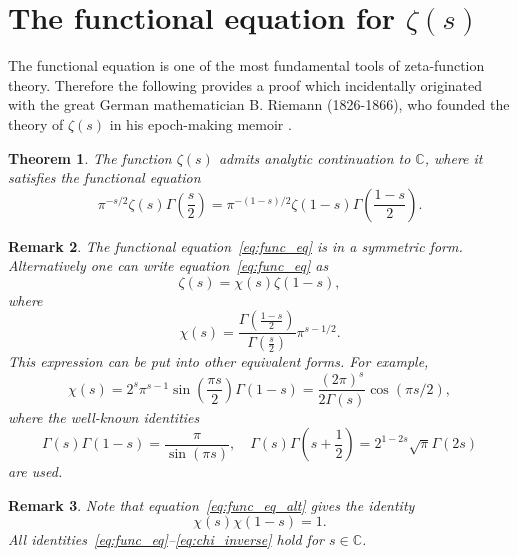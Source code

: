\documentclass[11pt]{article}
\newtheorem{theorem}{Theorem}[section]
\newtheorem{remark}[theorem]{Remark}
\begin{document}
\section{The functional equation for $\zeta(s)$}\label{sec:func_eq}

The functional equation is one of the most fundamental tools of zeta-function theory. Therefore the following provides a proof which incidentally originated with the great German mathematician B. Riemann (1826-1866), who founded the theory of $\zeta(s)$ in his epoch-making memoir \cite{Rie}.

\begin{theorem}\label{thm:func_eq}
The function $\zeta(s)$ admits analytic continuation to $\mathbb{C}$, where it satisfies the functional equation
\begin{equation}\label{eq:func_eq}
\pi^{-s/2} \zeta(s) \Gamma\left(\frac{s}{2}\right) = \pi^{-(1-s)/2} \zeta(1-s) \Gamma\left(\frac{1-s}{2}\right).
\end{equation}
\end{theorem}

\begin{remark}\label{rem:func_eq_alt}
The functional equation~\eqref{eq:func_eq} is in a symmetric form. Alternatively one can write equation~\eqref{eq:func_eq} as
\begin{equation}\label{eq:func_eq_alt}
\zeta(s) = \chi(s) \zeta(1-s),
\end{equation}
where
\begin{equation}\label{eq:chi_def}
\chi(s) = \frac{\Gamma\left(\frac{1-s}{2}\right)}{\Gamma\left(\frac{s}{2}\right)} \pi^{s-1/2}.
\end{equation}
This expression can be put into other equivalent forms. For example,
\begin{equation}\label{eq:chi_alt}
\chi(s) = 2^s \pi^{s-1} \sin\left(\frac{\pi s}{2}\right) \Gamma(1-s) = \frac{(2\pi)^s}{2\Gamma(s)} \cos(\pi s/2),
\end{equation}
where the well-known identities
\begin{equation}\label{eq:gamma_identities}
\Gamma(s)\Gamma(1-s) = \frac{\pi}{\sin(\pi s)}, \quad \Gamma(s)\Gamma\left(s + \frac{1}{2}\right) = 2^{1-2s}\sqrt{\pi}\Gamma(2s)
\end{equation}
are used.
\end{remark}

\begin{remark}\label{rem:chi_property}
Note that equation~\eqref{eq:func_eq_alt} gives the identity
\begin{equation}\label{eq:chi_inverse}
\chi(s)\chi(1-s) = 1.
\end{equation}
All identities~\eqref{eq:func_eq}--\eqref{eq:chi_inverse} hold for $s \in \mathbb{C}$.
\end{remark}
\end{document}
